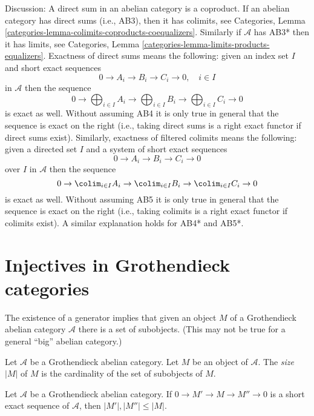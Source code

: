 \noindent
Discussion: A direct sum in an abelian category is a coproduct.
If an abelian category has direct sums (i.e., AB3), then it has colimits, see
Categories, Lemma \ref{categories-lemma-colimits-coproducts-coequalizers}. 
Similarly if $\mathcal{A}$ has AB3* then it has limits, see
Categories, Lemma \ref{categories-lemma-limits-products-equalizers}. 
Exactness of direct sums means the following: given an index set $I$
and short exact sequences
$$
0 \to A_i \to B_i \to C_i \to 0,\quad i \in I
$$
in $\mathcal{A}$ then the sequence
$$
0 \to
\bigoplus\nolimits_{i \in I} A_i \to
\bigoplus\nolimits_{i \in I} B_i \to
\bigoplus\nolimits_{i \in I} C_i \to 0
$$
is exact as well. Without assuming AB4 it is only true in general that
the sequence is exact on the right (i.e., taking direct sums is a right
exact functor if direct sums exist). Similarly, exactness of filtered
colimits means the following: given a directed set $I$
and a system of short exact sequences
$$
0 \to A_i \to B_i \to C_i \to 0
$$
over $I$ in $\mathcal{A}$ then the sequence
$$
0 \to
\colim_{i \in I} A_i \to
\colim_{i \in I} B_i \to
\colim_{i \in I} C_i \to 0
$$
is exact as well. Without assuming AB5 it is only true in general that
the sequence is exact on the right (i.e., taking colimits is a right
exact functor if colimits exist). A similar explanation holds for
AB4* and AB5*.



\section{Injectives in Grothendieck categories}
\label{section-grothendieck-categories}

\noindent
The existence of a generator implies that given an object $M$ of a
Grothendieck abelian category $\mathcal{A}$ there is a set of subobjects.
(This may not be true for a general ``big'' abelian category.)

\begin{definition}
\label{definition-size}
Let $\mathcal{A}$ be a Grothendieck abelian category.
Let $M$ be an object of $\mathcal{A}$.
The {\it size} $|M|$ of $M$ is the cardinality of the set of subobjects
of $M$.
\end{definition}

\begin{lemma}
\label{lemma-size-goes-down}
Let $\mathcal{A}$ be a Grothendieck abelian category.
If $0 \to M' \to M \to M'' \to 0$ is a short exact sequence of
$\mathcal{A}$, then $|M'|, |M''| \leq |M|$.
\end{lemma}

